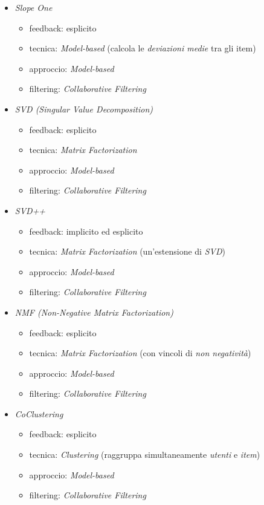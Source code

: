 \begin{itemize}[label=\textbullet]
    \item \textit{Slope One}
    \begin{itemize}
        \item feedback: esplicito
        \item tecnica: \textit{Model-based} (calcola le \textit{deviazioni medie} tra gli item)
        \item approccio: \textit{Model-based}
        \item filtering: \textit{Collaborative Filtering}
    \end{itemize}

    \item \textit{SVD (Singular Value Decomposition)}
    \begin{itemize}
        \item feedback: esplicito
        \item tecnica: \textit{Matrix Factorization}
        \item approccio: \textit{Model-based}
        \item filtering: \textit{Collaborative Filtering}
    \end{itemize}

    \item \textit{SVD++}
    \begin{itemize}
        \item feedback: implicito ed esplicito
        \item tecnica: \textit{Matrix Factorization} (un'estensione di \textit{SVD})
        \item approccio: \textit{Model-based}
        \item filtering: \textit{Collaborative Filtering}
    \end{itemize}

    \item \textit{NMF (Non-Negative Matrix Factorization)}
    \begin{itemize}
        \item feedback: esplicito
        \item tecnica: \textit{Matrix Factorization} (con vincoli di \textit{non negatività})
        \item approccio: \textit{Model-based}
        \item filtering: \textit{Collaborative Filtering}
    \end{itemize}

    \item \textit{CoClustering}
    \begin{itemize}
        \item feedback: esplicito
        \item tecnica: \textit{Clustering} (raggruppa simultaneamente \textit{utenti} e \textit{item})
        \item approccio: \textit{Model-based}
        \item filtering: \textit{Collaborative Filtering}
    \end{itemize}


\end{itemize}
